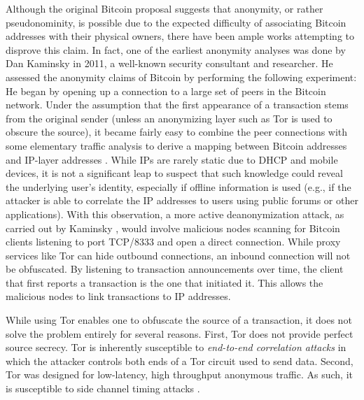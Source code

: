 Although the original Bitcoin proposal suggests that anonymity, or rather pseudonominity, is possible due to the expected difficulty of associating Bitcoin addresses with their physical owners, there have been ample works attempting to disprove this claim. In fact, one of the earliest anonymity analyses was done by Dan Kaminsky in 2011, a well-known security consultant and researcher. He assessed the anonymity claims of Bitcoin by performing the following experiment: He began by opening up a connection to a large set of peers in the Bitcoin network. Under the assumption that the first appearance of a transaction stems from the original sender (unless an anonymizing layer such as Tor is used to obscure the source), it became fairly easy to combine the peer connections with some elementary traffic analysis to derive a mapping between Bitcoin addresses and IP-layer addresses \cite{kaminsky}. While IPs are rarely static due to DHCP and mobile devices, it is not a significant leap to suspect that such knowledge could reveal the underlying user's identity, especially if offline information is used (e.g., if the attacker is able to correlate the IP addresses to users using public forums or other applications). With this observation, a more active deanonymization attack, as carried out by Kaminsky \cite{kaminsky,ReidHarrigan13}, would involve malicious nodes scanning for Bitcoin clients listening to port TCP/8333 and open a direct connection. While proxy services like Tor can hide outbound connections, an inbound connection will not be obfuscated. By listening to transaction announcements over time, the client that first reports a transaction is the one that initiated it. This allows the malicious nodes to link transactions to IP addresses.

While using Tor enables one to obfuscate the source of a transaction, it does not solve the problem entirely for several reasons. First, Tor does not provide perfect source secrecy. Tor is inherently susceptible to \emph{end-to-end correlation attacks} in which the attacker controls both ends of a Tor circuit used to send data. Second, Tor was designed for low-latency, high throughput anonymous traffic. As such, it is susceptible to side channel timing attacks \cite{bitcoin-tor-wiki}.

